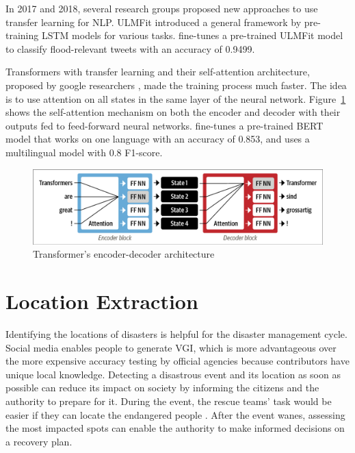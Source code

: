In 2017 and 2018, several research groups proposed new approaches to use transfer learning for
\ac{NLP}. \ac{ULMFit} \cite{howardUniversalLanguageModel2018} introduced a general framework by
pre-training \ac{LSTM} models for various tasks.
 fine-tunes a pre-trained \ac{ULMFit} model
to classify flood-relevant tweets with an accuracy of 0.9499. 

Transformers with transfer learning and their self-attention architecture, proposed by google
researchers \cite{vaswaniAttentionAllYou2017}, made the training process much faster. The idea is to
use attention on all states in the same layer of the neural network.
Figure~\ref{fig:encoder_decoder_transformer} shows the self-attention mechanism on both the encoder
and decoder with their outputs fed to feed-forward neural networks.
 fine-tunes a pre-trained
\ac{BERT}\cite{devlinBERTPretrainingDeep2019}  model that works on one language with an accuracy of
0.853, and  uses a multilingual model with 0.8
F1-score.

\begin{figure}[H]
\begin{center}
  \includegraphics[width=\columnwidth, trim={0.1cm 0.1cm 0.1cm 0.1cm},clip]{./images/encoder-decoder_transformer.png}
\end{center}
\caption{Transformer's encoder-decoder architecture \cite{tunstallNaturalLanguageProcessing2022}}
\label{fig:encoder_decoder_transformer}
\end{figure}


\section{Location Extraction}
Identifying the locations of disasters is helpful for the disaster management cycle. Social media
enables people to generate \ac{VGI}, which is more advantageous over the more expensive accuracy
testing by official agencies because contributors have unique local knowledge.  Detecting a
disastrous event and its location as soon as possible can reduce its impact on society
\cite{debruijnGlobalDatabaseHistoric2019b} by informing the citizens and the authority to prepare
for it. During the event, the rescue teams' task would be easier if they can locate the endangered
people \cite{singhEventClassificationLocation2019}. After the event wanes, assessing the most
impacted spots can enable the authority to make informed decisions on a recovery plan.

